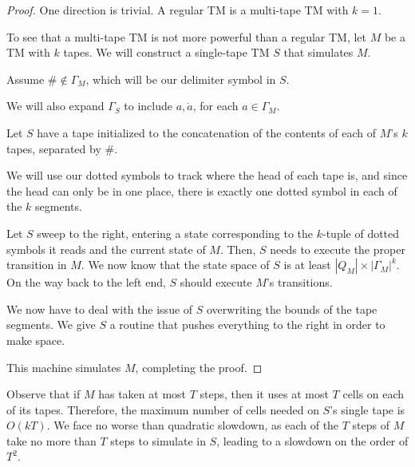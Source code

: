 

\begin{proof}
	
	One direction is trivial.  A regular TM is a multi-tape TM with $k=1$.
	
	To see that a multi-tape TM is not more powerful than a regular TM, let $M$ be a TM with $k$ tapes.  We will construct a single-tape TM $S$ that simulates $M$.
	
	Assume $\#\notin \Gamma_M$, which will be our delimiter symbol in $S$.
	
	We will also expand $\Gamma_S$ to include $a,\dot{a}$, for each $a\in\Gamma_M$.
	
	Let $S$ have a tape initialized to the concatenation of the contents of each of $M$'s $k$ tapes, separated by $\#$.
	
	We will use our dotted symbols to track where the head of each tape is, and since the head can only be in one place, there is exactly one dotted symbol in each of the $k$ segments.
	
	Let $S$ sweep to the right, entering a state corresponding to the $k$-tuple of dotted symbols it reads and the current state of $M$.  Then, $S$ needs to execute the proper transition in $M$.  We now know that the state space of $S$ is at least $|Q_M|\times |\Gamma_M|^k$.  On the way back to the left end, $S$ should execute $M$'s transitions.
	
	We now have to deal with the issue of $S$ overwriting the bounds of the tape segments.  We give $S$ a routine that pushes everything to the right in order to make space.
	
	This machine simulates $M$, completing the proof.
	
	
	
\end{proof}

Observe that if $M$ has taken at most $T$ steps, then it uses at most $T$ cells on each of its tapes.  Therefore, the maximum number of cells needed on $S$'s single tape is $O(kT)$.  We face no worse than quadratic slowdown, as each of the $T$ steps of $M$ take no more than $T$ steps to simulate in $S$, leading to a slowdown on the order of $T^2$.  

